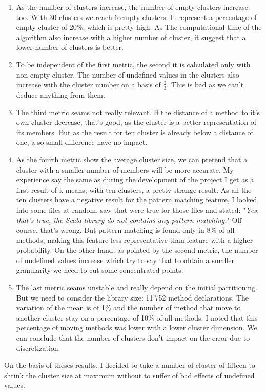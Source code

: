 \documentclass[12pt]{article}
\begin{document}
\begin{enumerate}
\item As the number of clusters increase, the number of empty clusters increase too. With 30 clusters we reach 6 empty clusters. It represent a percentage of empty cluster of 20\%, which is pretty high. As The computational time of the algorithm also increase with a higher number of cluster, it suggest that a lower number of clusters is better.
\item To be independent of the first metric, the second it is calculated only with non-empty cluster. The number of undefined values in the clusters also increase with the cluster number on a basis of $\frac{2}{3}$. This is bad as we can't deduce anything from them.
\item The third metric seams not really relevant. If the distance of a method to it's own cluster decrease, that's good, as the cluster is a better representation of its members. But as the result for ten cluster is already below a distance of one, a so small difference have no impact.
\item As the fourth metric show the average cluster size, we can pretend that a cluster with a smaller number of members will be more accurate. My experience say the same as during the development of the project I get as a first result of k-means, with ten clusters, a pretty strange result. As all the ten clusters have a negative result for the pattern matching feature, I looked into some files at random, saw that were true for those files and stated: "\textit{Yes, that's true, the Scala library do not contains any pattern matching.}" Off course, that's wrong. But pattern matching is found only in 8\% of all methods, making this feature less representative than feature with a higher probability. On the other hand, as pointed by the second metric, the number of undefined values increase which try to say that to obtain a smaller granularity we need to cut some concentrated points.
\item The last metric seams unstable and really depend on the initial partitioning. But we need to consider the library size: 11'752 method declarations. The variation of the mean is of 1\% and the number of method that move to another cluster stay on a percentage of 10\% of all methods. I noted that this percentage of moving methods was lower with a lower cluster dimension. We can conclude that the number of clusters don't impact on the error due to discretization.
\end{enumerate}
On the basis of theses results, I decided to take a number of cluster of fifteen to shrink the cluster size at maximum without to suffer of bad effects of undefined values.
\end{document}
